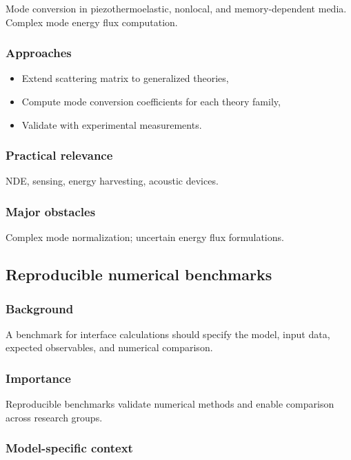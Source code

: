 Mode conversion in piezothermoelastic, nonlocal, and memory-dependent media. Complex mode energy flux computation.

\subsubsection{Approaches}

\begin{itemize}
\item Extend scattering matrix to generalized theories,
\item Compute mode conversion coefficients for each theory family,
\item Validate with experimental measurements.
\end{itemize}

\subsubsection{Practical relevance}

NDE, sensing, energy harvesting, acoustic devices.

\subsubsection{Major obstacles}

Complex mode normalization; uncertain energy flux formulations.

\subsection{Reproducible numerical benchmarks}
\label{sec:reproducible-benchmarks}

\subsubsection{Background}

A benchmark for interface calculations should specify the model, input data, expected observables, and numerical comparison.

\subsubsection{Importance}

Reproducible benchmarks validate numerical methods and enable comparison across research groups.

\subsubsection{Model-specific context}

